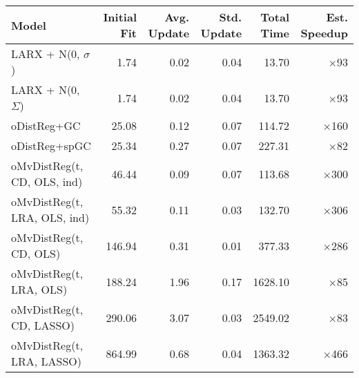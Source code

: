 \begin{tabular}{lrrrrr}
\toprule
Model & Initial Fit & Avg. Update & Std. Update & Total Time & Est. Speedup \\
\midrule
LARX + N(0, $\sigma$) & 1.74 & 0.02 & 0.04 & 13.70 & $\times$93 \\
LARX + N(0, $\Sigma$) & 1.74 & 0.02 & 0.04 & 13.70 & $\times$93 \\
oDistReg+GC & 25.08 & 0.12 & 0.07 & 114.72 & $\times$160 \\
oDistReg+spGC & 25.34 & 0.27 & 0.07 & 227.31 & $\times$82 \\
oMvDistReg(t, CD, OLS, ind) & 46.44 & 0.09 & 0.07 & 113.68 & $\times$300 \\
oMvDistReg(t, LRA, OLS, ind) & 55.32 & 0.11 & 0.03 & 132.70 & $\times$306 \\
oMvDistReg(t, CD, OLS) & 146.94 & 0.31 & 0.01 & 377.33 & $\times$286 \\
oMvDistReg(t, LRA, OLS) & 188.24 & 1.96 & 0.17 & 1628.10 & $\times$85 \\
oMvDistReg(t, CD, LASSO) & 290.06 & 3.07 & 0.03 & 2549.02 & $\times$83 \\
oMvDistReg(t, LRA, LASSO) & 864.99 & 0.68 & 0.04 & 1363.32 & $\times$466 \\
\bottomrule
\end{tabular}
